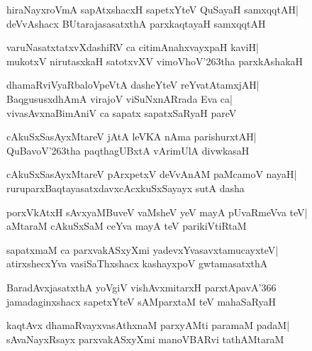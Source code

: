 \documentclass[twoside,12pt,openright]{book}
\def\S{\char'263}
\newcounter{shloka}[chapter]
\begin{document}
\begin{shloka}%
hiraNayxroVmA sapAtxshacxH sapetxYteV QuSayaH samxqqtAH|\\
deVvAshacx BUtarajasasatxthA parxkaqtayaH samxqqtAH
\end{shloka}

\begin{shloka}%
varuNasatxtatxvXdashiRV ca citimAnahxvayxpaH kaviH|\\
mukotxV nirutasxkaH satotxvXV vimoVhoV\S tha parxkAshakaH
\end{shloka}

\begin{shloka}%
dhamaRviVyaRbaloVpeVtA dasheYteV reYvatAtamxjAH|\\
BaqgususxdhAmA virajoV viSuNxnARrada Eva ca|\\
vivasAvxnaBimAniV ca sapatx sapatxSaRyaH pareV
\end{shloka}

\begin{shloka}%
cAkuSxSasAyxMtareV jAtA leVKA nAma parishurxtAH|\\
QuBavoV\S tha paqthagUBxtA vArimUlA divwkasaH
\end{shloka}

\begin{shloka}%
cAkuSxSasAyxMtareV pArxpetxV deVvAnAM paMcamoV nayaH|\\
ruruparxBaqtayasatxdavxcAcxkuSxSayayx sutA dasha
\end{shloka}

\begin{shloka}%
porxVkAtxH sAvxyaMBuveV vaMsheV yeV mayA pUvaRmeVva teV|\\
aMtaraM cAkuSxSaM ceYva mayA teV parikiVtiRtaM
\end{shloka}

\begin{shloka}%
sapatxmaM ca parxvakASxyXmi yadevxYvasavxtamucayxteV|\\
atirxshecxYva vasiSaThxshacx kashayxpoV gwtamasatxthA
\end{shloka}

\begin{shloka}%
BaradAvxjasatxthA yoVgiV vishAvxmitarxH parxtApavA\char'366\\
jamadaginxshacx sapetxYteV sAMparxtaM teV mahaSaRyaH
\end{shloka}

\begin{shloka}%
kaqtAvx dhamaRvayxvasAthxnaM parxyAMti paramaM padaM|\\
sAvaNayxRsayx parxvakASxyXmi manoVBARvi tathAMtaraM 
\end{shloka}
\end{document}

